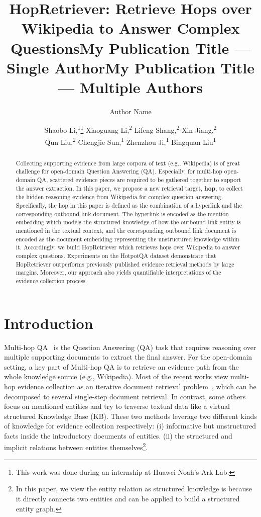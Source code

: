 \documentclass[letterpaper]{article} \usepackage{aaai21}  \usepackage{times}  \usepackage{helvet} \usepackage{courier}  \usepackage[hyphens]{url}  \usepackage{graphicx} \urlstyle{rm} \def\UrlFont{\rm}  \usepackage{graphicx}  \usepackage{natbib}  \usepackage{caption} \frenchspacing  \setlength{\pdfpagewidth}{8.5in}  \setlength{\pdfpageheight}{11in}
\title{HopRetriever: Retrieve Hops over Wikipedia to Answer Complex Questions}
\title{My Publication Title --- Single Author}
\author {
Author Name \\
}
\title{My Publication Title --- Multiple Authors}
\author {
Shaobo Li,\textsuperscript{\rm 1}\thanks{This work was done during an internship at Huawei Noah’s Ark Lab.}
Xiaoguang Li,\textsuperscript{\rm 2}
        Lifeng Shang,\textsuperscript{\rm 2}
        Xin Jiang,\textsuperscript{\rm 2}\\
        Qun Liu,\textsuperscript{\rm 2}
        Chengjie Sun,\textsuperscript{\rm 1}
        Zhenzhou Ji,\textsuperscript{\rm 1}
        Bingquan Liu\textsuperscript{\rm 1}
        \\
}
\begin{document}
\maketitle

\begin{abstract} 
Collecting supporting evidence from large corpora of text (e.g., Wikipedia) is of great challenge for open-domain Question Answering (QA). Especially, for multi-hop open-domain QA, scattered evidence pieces are required to be gathered together to support the answer extraction. In this paper, we propose a new retrieval target, \textbf{hop}, to collect the hidden reasoning evidence from Wikipedia for complex question answering. Specifically, the hop in this paper is defined as the combination of a hyperlink and the corresponding outbound link document. The hyperlink is encoded as the mention embedding which models the structured knowledge of how the outbound link entity is mentioned in the textual context, and the corresponding outbound link document is encoded as the document embedding representing the unstructured knowledge within it. Accordingly, we build HopRetriever which retrieves hops over Wikipedia to answer complex questions. Experiments on the HotpotQA dataset demonstrate that HopRetriever outperforms previously published evidence retrieval methods by large margins. Moreover, our approach also yields quantifiable interpretations of the evidence collection process. 
\end{abstract}


\section{Introduction}
Multi-hop QA~\cite{hotpot-qa-dataset} is the Question Answering (QA) task that requires reasoning over multiple supporting documents to extract the final answer. For the open-domain setting, a key part of Multi-hop QA is to retrieve an evidence path from the whole knowledge source (e.g., Wikipedia). Most of the recent works view multi-hop evidence collection as an iterative document retrieval problem~\cite{asai2019PR,Multi-Hop-Paragraph-Retrieval,Multi-step-Retriever-Reader}, which can be decomposed to several single-step document retrieval. In contrast, some others~\cite{DrKIT,CogQA} focus on mentioned entities and try to traverse textual data like a virtual structured Knowledge Base (KB). These two methods leverage two different kinds of knowledge for evidence collection respectively: (i) informative but unstructured facts inside the introductory documents of entities. (ii) the structured and implicit relations between entities themselves\footnote{In this paper, we view the entity relation as structured knowledge is because it directly connects two entities and can be applied to build a structured entity graph.}. 
\end{document}
